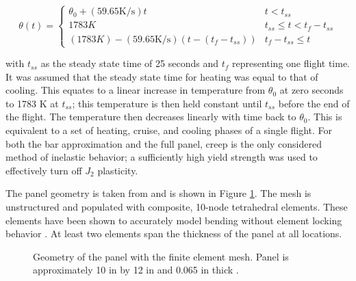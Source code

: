 \documentclass[conf]{new-aiaa}
\begin{document}
\begin{equation}
\theta(t) = \begin{cases}
 \theta_0 + (59.65 \text{K/s})t                & t < t_{ss} \\
1783 K                                         & t_{ss} \leq t < t_f-t_{ss} \\
(1783 K) - (59.65 \text{K/s})(t-(t_f-t_{ss}))  & t_f - t_{ss} \leq t
\end{cases}
\end{equation}

\noindent
with $t_{ss}$ as the steady state time of 25 seconds
and $t_f$ representing one flight time.
It was assumed that the steady state time for heating was
equal to that of cooling.
This equates to a linear increase in temperature from 
$\theta_0$ at zero seconds to 1783 K at $t_{ss}$;
this temperature is then held constant until $t_{ss}$ before
the end of the flight.
The temperature then decreases linearly with time back to $\theta_0$.
This is equivalent to a set of heating, cruise, and cooling phases of a single flight.
For both the bar approximation and the full panel, creep is the only
considered method of inelastic behavior; 
a sufficiently high yield strength was used to effectively 
turn off $J_2$ plasticity.

The panel geometry is taken from 
\cite{culler_impact_of_FTS_coupling_on_response_prediction_hypersonic_skin_panels}
and is shown in Figure \ref{fig_panel_face_mesh}.
The mesh is unstructured and populated with composite, 10-node tetrahedral elements.
These elements have been shown to accurately model bending 
without element locking behavior
\cite{ostien_10_node_comp_tet_FE_for_solid_mechanics, 
  clough_automated_wing_internal_structure_placement_guided_by_FEA}.
At least two elements span the thickness of the panel at all locations. 


\begin{figure}[H] 
  \centering
  \caption{ Geometry of the panel with the finite element mesh. 
            Panel is approximately 10 in by 12 in and 0.065 in thick
            \cite{culler_impact_of_FTS_coupling_on_response_prediction_hypersonic_skin_panels}.}
  \label{fig_panel_face_mesh}
\end{figure}
\end{document}
